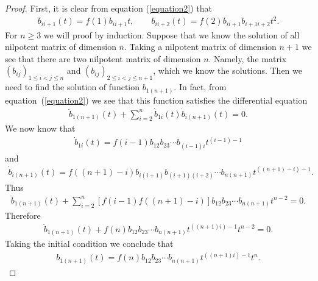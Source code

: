 \documentclass[pdftex]{sigma}
\numberwithin{equation}{section}
\begin{document}
\begin{proof}
  First, it is clear from equation (\ref{equation2}) that
  \begin{gather*}
    b_{ii+1}(t)   =   f(1)b_{ii+1}t, \qquad
    b_{ii+2}(t)   =   f(2)b_{ii+1}b_{i+1i+2}t^2.
  \end{gather*}
  For $n\geq 3$ we will proof by induction. Suppose that we know the solution of all nilpotent matrix of dimension $n$. Taking a nilpotent matrix of dimension  $n+1$ we see that there are two nilpotent matrix of dimension $n$. Namely, the matrix $(b_{ij})_{1\leq i< j\leq n}$ and $(b_{ij})_{2\leq i< j\leq n+1}$, which we know the solutions. Then we need to f\/ind the solution of function $b_{1(n+1)}$. In fact, from equation~(\ref{equation2}) we see that this function satisf\/ies the  dif\/ferential equation
  \begin{gather*}
    \ddot{b}_{1(n+1)}(t) + \sum_{i=2}^{n} \dot{b}_{1i}(t)\dot{b}_{i(n+1)}(t) = 0.
  \end{gather*}
  We now know that
  \begin{gather*}
    \dot{b}_{1i}(t) = f(i-1)b_{12}b_{23} \cdots b_{(i-1)i}t^{(i-1)-1}
  \end{gather*}
  and
  \begin{gather*}
    \dot{b}_{i(n+1)}(t) = f((n+1)-i)b_{i(i+1)}b_{(i+1)(i+2)} \cdots b_{n(n+1)}t^{((n+1)-i)-1}.
  \end{gather*}
  Thus
  \begin{gather*}
    \ddot{b}_{1(n+1)}(t) + \sum_{i=2}^{n}[f(i-1)f((n+1)-i)]b_{12}b_{23}  \cdots b_{n(n+1)} t^{n-2}   =   0.
  \end{gather*}
  Therefore
  \begin{gather*}
    \ddot{b}_{1(n+1)}(t) + f(n)b_{12}b_{23}  \cdots b_{n(n+1)}t^{((n+1)i)-1} t^{n-2}  =  0.
  \end{gather*}
  Taking the initial condition we conclude that
  \begin{gather*}
    b_{1(n+1)}(t)=f(n)b_{12}b_{23} \cdots b_{n(n+1)}t^{((n+1)i)-1} t^{n}.\tag*{\qed}
  \end{gather*}
  \renewcommand{\qed}{}
\end{proof}
\end{document}
